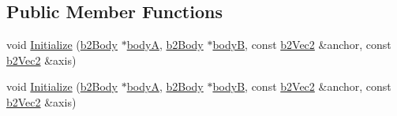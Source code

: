 \subsection*{Public Member Functions}
\begin{DoxyCompactItemize}
\item 
void \hyperlink{structb2WheelJointDef_af26887092d36c3cd03898401a38783e2}{Initialize} (\hyperlink{classb2Body}{b2\+Body} $\ast$\hyperlink{structb2JointDef_a592b8e186f5f0d8848ef6b7ce77f0f70}{bodyA}, \hyperlink{classb2Body}{b2\+Body} $\ast$\hyperlink{structb2JointDef_a3d1a39831332b8c5a41611c06396480a}{bodyB}, const \hyperlink{structb2Vec2}{b2\+Vec2} \&anchor, const \hyperlink{structb2Vec2}{b2\+Vec2} \&axis)
\item 
void \hyperlink{structb2WheelJointDef_af26887092d36c3cd03898401a38783e2}{Initialize} (\hyperlink{classb2Body}{b2\+Body} $\ast$\hyperlink{structb2JointDef_a592b8e186f5f0d8848ef6b7ce77f0f70}{bodyA}, \hyperlink{classb2Body}{b2\+Body} $\ast$\hyperlink{structb2JointDef_a3d1a39831332b8c5a41611c06396480a}{bodyB}, const \hyperlink{structb2Vec2}{b2\+Vec2} \&anchor, const \hyperlink{structb2Vec2}{b2\+Vec2} \&axis)
\end{DoxyCompactItemize}
